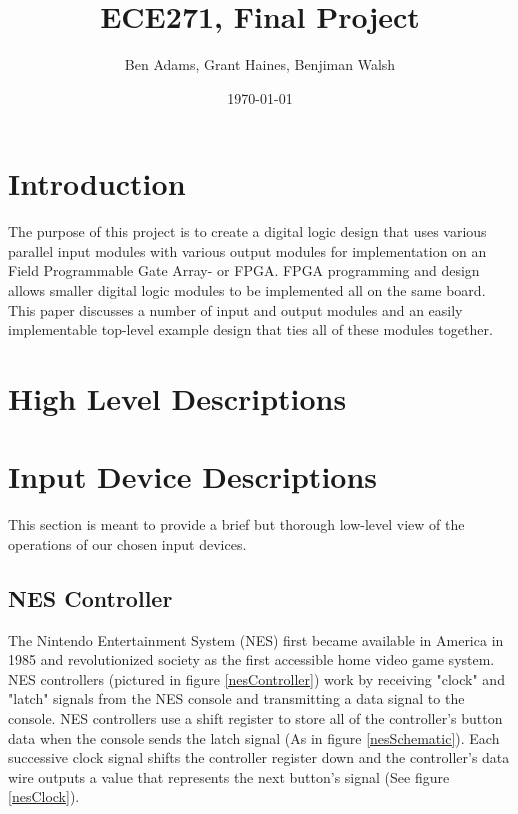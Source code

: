 \documentclass[a4paper]{article}
\title{ECE271, Final Project}
\author{Ben Adams, Grant Haines, Benjiman Walsh}
\date{\today}
\begin{document}
\maketitle

\pagebreak

\tableofcontents

\section{Introduction}

The purpose of this project is to create a digital logic design that uses various parallel input modules with various output modules for implementation on an Field Programmable Gate Array- or FPGA. FPGA programming and design allows smaller digital logic modules to be implemented all on the same board. This paper discusses a number of input and output modules and an easily implementable top-level example design that ties all of these modules together. 


\section{High Level Descriptions}%


\section{Input Device Descriptions}

This section is meant to provide a brief but thorough low-level view of the operations of our chosen input devices. 

\subsection{NES Controller}

The Nintendo Entertainment System (NES) first became available in America in 1985 and revolutionized society as the first accessible home video game system. NES controllers (pictured in figure \ref{nesController}) work by receiving "clock" and "latch" signals from the NES console and transmitting a data signal to the console. NES controllers use a shift register to store all of the controller's button data when the console sends the latch signal (As in figure \ref{nesSchematic}). Each successive clock signal shifts the controller register down and the controller's data wire outputs a value that represents the next button's signal (See figure \ref{nesClock}). 
\end{document}
